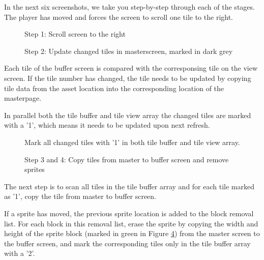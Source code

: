 \documentclass[book.tex]{subfiles}
\begin{document}
In the next six screenshots, we take you step-by-step through each of the stages. The player has moved and forces the screen to scroll one tile to the right. \\

\begin{figure}[H]
\centering
 \caption{Step 1: Scroll screen to the right}
 \label{fig:kc1_3_start}
\end{figure}

\begin{figure}[H]
\centering
 \caption{Step 2: Update changed tiles in masterscreen, marked in dark grey}
 \label{fig:kc1_3_update_masterscreen}
\end{figure}

Each tile of the buffer screen is compared with the corresponsing tile on the view screen. If the tile number has changed, the tile needs to be updated by copying tile data from the asset location into the corresponding location of the masterpage.\\
\par
In parallel both the tile buffer and tile view array the changed tiles are marked with a '1', which means it needs to be updated upon next refresh.

\begin{figure}[H]
\centering
 \caption{Mark all changed tiles with '1' in both tile buffer and tile view array.}
 \label{fig:kc1_3_update_refresh_img_1}
\end{figure}


\pagebreak

\begin{figure}[H]
\centering
 \caption{Step 3 and 4: Copy tiles from master to buffer screen and remove sprites}
 \label{fig:kc1_3_update_remove}
\end{figure}

The next step is to scan all tiles in the tile buffer array and for each tile marked as '1', copy the tile from master to buffer screen.\\
\par
If a sprite has moved, the previous sprite location is added to the block removal list. For each block in this removal list, erase the sprite by copying the width and height of the sprite block (marked in green in Figure \ref{fig:kc1_3_update_remove}) from the master screen to the buffer screen, and mark the corresponding tiles only in the tile buffer array with a '2'.
\end{document}
